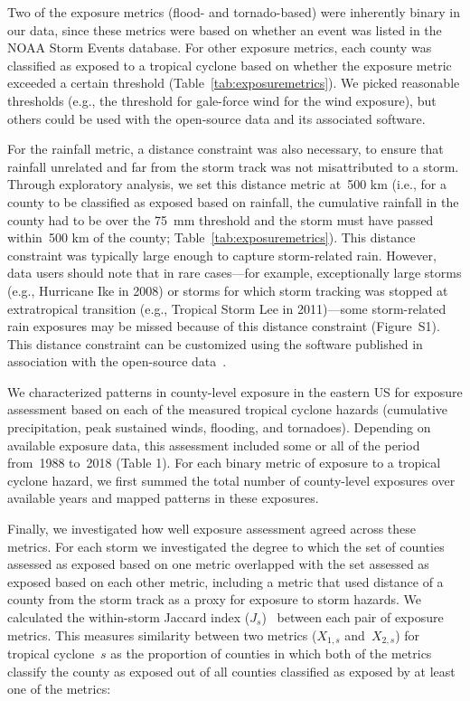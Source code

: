Two of the exposure metrics (flood- and tornado-based) were inherently binary
in our data, since these metrics were based on whether an event was listed in
the NOAA Storm Events database.  For other exposure metrics, each county was
classified as exposed to a tropical cyclone based on whether the exposure
metric exceeded a certain threshold (Table~\ref{tab:exposuremetrics}). We
picked reasonable thresholds (e.g., the threshold for gale-force wind for the
wind exposure), but others could be used with the open-source data and its
associated software. 

For the rainfall metric, a distance constraint was also necessary, to ensure
that rainfall unrelated and far from the storm track was not misattributed to a
storm. Through exploratory analysis, we set this distance metric at~500
\si{\kilo\metre} (i.e., for a county to be classified as exposed based on
rainfall, the cumulative rainfall in the county had to be over the
75~\si{\milli\metre} threshold and the storm must have passed
within~500 \si{\kilo\metre} of the county; Table~\ref{tab:exposuremetrics}).
This distance constraint was typically large enough to capture storm-related
rain.  However, data users should note that in rare cases---for example,
exceptionally large storms (e.g., Hurricane Ike in 2008) or storms for which
storm tracking was stopped at extratropical transition (e.g., Tropical Storm
Lee in 2011)---some storm-related rain exposures may be missed because of this
distance constraint (Figure~S1). This distance constraint can be customized
using the software published in association with the open-source
data~\parencite{hurricaneexposure}.

We characterized patterns in county-level exposure in the eastern \ac{US} for
exposure assessment based on each of the measured tropical cyclone hazards
(cumulative precipitation, peak sustained winds, flooding, and tornadoes).
Depending on available exposure data, this assessment included some or all of
the period from~1988 to~2018 (Table 1). For each binary metric of exposure to a
tropical cyclone hazard, we first summed the total number of county-level
exposures over available years and mapped patterns in
these exposures. 

Finally, we investigated how well exposure assessment agreed across 
these metrics. For each storm we investigated the degree to which the 
set of counties assessed as exposed based on one metric overlapped with the set
assessed as exposed based on each other metric, including a metric that used
distance of a county from the storm track as a proxy for exposure to storm hazards. 
We calculated the within-storm
Jaccard index ($J_s$)~\parencite{jaccard1901distribution, jaccard1908nouvelles} between
each pair of exposure metrics. This measures similarity
between two metrics ($X_{1,s}$ and~$X_{2,s}$) for tropical cyclone~$s$ as the
proportion of counties in which both of the metrics classify the county as
exposed out of all counties classified as exposed by at least one of the
metrics:

